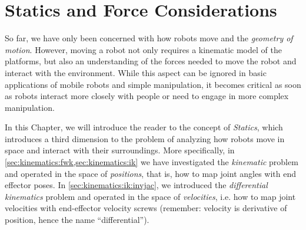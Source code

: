 \chapter{Statics and Force Considerations}\label{ch:forces}

So far, we have only been concerned with how robots move and the \textsl{geometry of motion}.
However, moving a robot not only requires a kinematic model of the platforms, but also an understanding of the forces needed to move the robot and interact with the environment.
While this aspect can be ignored in basic applications of mobile robots and simple manipulation, it becomes critical as soon as robots interact more closely with people or need to engage in more complex manipulation.

In this Chapter, we will introduce the reader to the concept of \emph{Statics}, which introduces a third dimension to the problem of analyzing how robots move in space and interact with their surroundings.
More specifically, in \cref{sec:kinematics:fwk,sec:kinematics:ik} we have investigated the \textsl{kinematic} problem and operated in the space of \textsl{positions}, that is, how to map joint angles with end effector poses.
In \cref{sec:kinematics:ik:invjac}, we introduced the \textsl{differential kinematics} problem and operated in the space of \textsl{velocities}, i.e. how to map joint velocities with end-effector velocity screws (remember: velocity is derivative of position, hence the name ``differential'').
